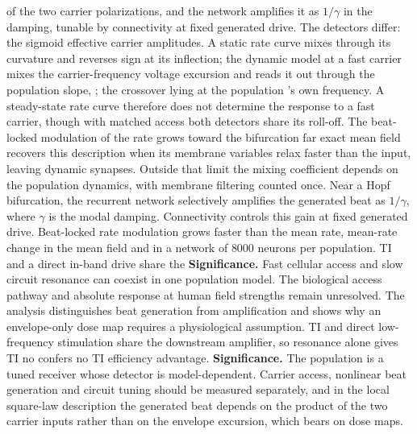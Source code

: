\documentclass[11pt,a4paper]{article}
\providecommand{\DIFaddtex}[1]{{\protect\color{blue} \sf #1}} %
\providecommand{\DIFdeltex}[1]{{\protect\color{red} \scriptsize #1}} %
\providecommand{\DIFaddbegin}{} %
\providecommand{\DIFaddend}{} %
\providecommand{\DIFdelbegin}{} %
\providecommand{\DIFdelend}{} %
\providecommand{\DIFadd}[1]{\texorpdfstring{\DIFaddtex{#1}}{#1}} %
\providecommand{\DIFdel}[1]{\texorpdfstring{\DIFdeltex{#1}}{}} %
\begin{document}
of the \DIFdelbegin \DIFdel{two carrier polarizations, and the network amplifies it as
$1/\gamma$ in the damping, tunable by connectivity at fixed generated drive. The detectors
differ: the sigmoid }\DIFdelend \DIFaddbegin \DIFadd{effective carrier amplitudes. A static rate curve }\DIFaddend mixes through its curvature\DIFdelbegin \DIFdel{and reverses sign at its inflection;
the dynamic model at a fast carrier mixes the carrier-frequency voltage excursion and reads it
out through the population slope, }\DIFdelend \DIFaddbegin \DIFadd{;
}\DIFaddend the \DIFdelbegin \DIFdel{crossover lying at the population 's own frequency. A
steady-state rate curve therefore does not determine the response to a fast carrier, though with matched access both detectors share its roll-off. The
beat-locked modulation of the rate grows toward the bifurcation far }\DIFdelend \DIFaddbegin \DIFadd{exact mean field recovers this description when its membrane variables relax faster
than the input, leaving dynamic synapses. Outside that limit the mixing coefficient
depends on the population dynamics, with membrane filtering counted once. Near a Hopf
bifurcation, the recurrent network selectively amplifies the generated beat as
$1/\gamma$, where $\gamma$ is the modal damping. Connectivity controls this gain at
fixed generated drive. Beat-locked rate modulation grows }\DIFaddend faster than the \DIFdelbegin \DIFdel{mean
rate, }\DIFdelend \DIFaddbegin \DIFadd{mean-rate change
}\DIFaddend in the mean field and in a network of $8000$ neurons per population.
\DIFdelbegin \DIFdel{TI and a direct
in-band drive share the }\DIFdelend \DIFaddbegin \DIFadd{\textbf{Significance.} Fast cellular access and slow circuit resonance can coexist in
one population model. The biological access pathway and absolute response at human
field strengths remain unresolved. The analysis distinguishes beat generation from
amplification and shows why an envelope-only dose map requires a physiological
assumption. TI and direct low-frequency stimulation share the downstream }\DIFaddend amplifier,
so resonance alone \DIFdelbegin \DIFdel{gives TI no }\DIFdelend \DIFaddbegin \DIFadd{confers no TI }\DIFaddend efficiency advantage.
\DIFdelbegin \DIFdel{\textbf{Significance.} The population is a tuned receiver whose detector is
model-dependent. Carrier access, nonlinear beat generation and circuit tuning should be
measured separately, and in the local square-law description the generated beat depends on
the product of the two carrier inputs rather than on the envelope excursion, which bears on
dose maps.
}\DIFdelend
\end{document}
